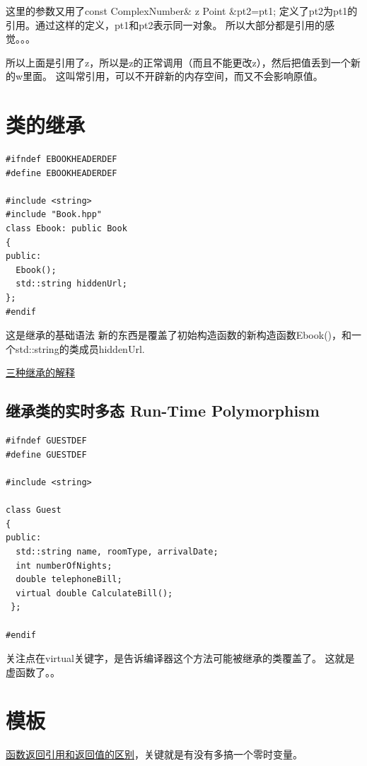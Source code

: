 \documentclass[
]{book}
\theoremstyle{definition}
\theoremstyle{definition}
\theoremstyle{definition}
\theoremstyle{remark}
\begin{document}
这里的参数又用了const ComplexNumber\& z
Point \&pt2=pt1; 定义了pt2为pt1的引用。通过这样的定义，pt1和pt2表示同一对象。
所以大部分都是引用的感觉。。。

所以上面是引用了z，所以是z的正常调用（而且不能更改z），然后把值丢到一个新的w里面。
这叫常引用，可以不开辟新的内存空间，而又不会影响原值。

\hypertarget{ux7c7bux7684ux7ee7ux627f}{%
\section{类的继承}\label{ux7c7bux7684ux7ee7ux627f}}

\begin{verbatim}
#ifndef EBOOKHEADERDEF 
#define EBOOKHEADERDEF

#include <string> 
#include "Book.hpp" 
class Ebook: public Book 
{ 
public:
  Ebook();
  std::string hiddenUrl; 
}; 
#endif
\end{verbatim}

这是继承的基础语法
新的东西是覆盖了初始构造函数的新构造函数Ebook()，和一个std::string的类成员hiddenUrl.

\href{https://www.cnblogs.com/qlwy/archive/2011/08/25/2153584.html}{三种继承的解释}

\hypertarget{ux7ee7ux627fux7c7bux7684ux5b9eux65f6ux591aux6001-run-time-polymorphism}{%
\subsection{继承类的实时多态 Run-Time Polymorphism}\label{ux7ee7ux627fux7c7bux7684ux5b9eux65f6ux591aux6001-run-time-polymorphism}}

\begin{verbatim}
#ifndef GUESTDEF 
#define GUESTDEF

#include <string>

class Guest 
{ 
public:
  std::string name, roomType, arrivalDate;
  int numberOfNights;
  double telephoneBill;
  virtual double CalculateBill(); 
 };

#endif
\end{verbatim}

关注点在virtual关键字，是告诉编译器这个方法可能被继承的类覆盖了。
这就是虚函数了。。

\hypertarget{ux6a21ux677f}{%
\section{模板}\label{ux6a21ux677f}}

\href{https://www.cnblogs.com/JMLiu/p/7928425.html}{函数返回引用和返回值的区别}，关键就是有没有多搞一个零时变量。
\end{document}
